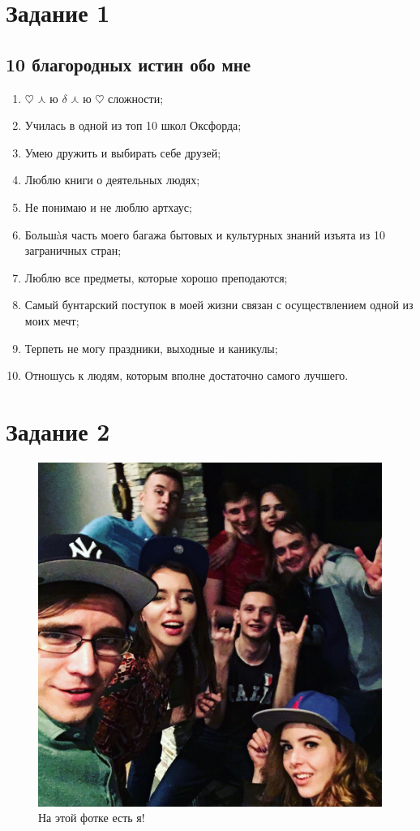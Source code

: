 \documentclass[10pt, a4paper]{article}  %
\author{Голованова Лиза}
\begin{document}
 
\section*{Задание 1}
\subsection*{10 благородных истин обо мне}

\begin{enumerate}
\item $\heartsuit$ $\curlywedge$ ю $\delta$ $\curlywedge$ ю $\heartsuit$ сложности;
\item Училась в одной из топ 10 школ Оксфорда;
\item Умею дружить и выбирать себе друзей;
\item Люблю книги о деятельных людях;
\item Не понимаю и не люблю артхаус;
\item Большàя часть моего багажа бытовых и культурных знаний изъята из 10 заграничных стран; 
\item Люблю все предметы, которые хорошо преподаются; 
\item Самый бунтарский поступок в моей жизни связан с осуществлением одной из моих мечт;
\item Терпеть не могу праздники, выходные и каникулы;
\item Отношусь к людям, которым вполне достаточно самого лучшего.
\end{enumerate}

\section*{Задание 2}

\begin{figure}[h]
\includegraphics[scale=0.25]{image}
\caption{На этой фотке есть я!}
\end{figure}
\end{document}
